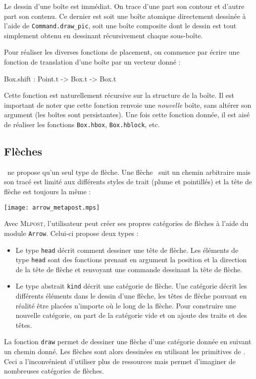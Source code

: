 \documentclass[twoside]{studia-Hermann}
\newcommand{\mlpost}{\textsc{Mlpost}}
\newcommand{\metapost}{\MP}
\begin{document}
Le dessin d'une boîte est immédiat. On trace d'une part son contour et
d'autre part son contenu. Ce dernier est soit
une boîte atomique directement dessinée à l'aide de
\texttt{Command.draw\_pic}, soit une boîte composite dont le dessin
est tout simplement obtenu en dessinant récursivement chaque sous-boîte.

Pour réaliser les diverses fonctions de placement, on commence par
écrire une fonction de translation d'une boîte par un vecteur donné :
\begin{ocaml}
  Box.shift : Point.t -> Box.t -> Box.t
\end{ocaml}
Cette fonction est naturellement récursive sur la structure de la
boîte. Il est important de noter que cette fonction renvoie une
\emph{nouvelle} boîte, sans altérer son argument (les boîtes sont
persistantes). Une fois cette fonction donnée, il est aisé de réaliser
les fonctions \texttt{Box.hbox}, \texttt{Box.hblock}, etc.

\subsection{Flèches} \label{subsec:arrows} %

\metapost\ ne propose qu'un seul type de flèche.
Une flèche \metapost\ suit  un chemin arbitraire   mais son tracé est
limité aux différents styles de trait (plume et pointillés) et la tête
de flèche est toujours la même : 
\begin{center}
\texttt{[image: arrow\_metapost.mps]}
\end{center}
Avec \mlpost, l'utilisateur peut créer ses propres catégories de
flèches à l'aide du module \texttt{Arrow}. Celui-ci propose deux types :
\begin{itemize}
\item  Le  type \texttt{head}  décrit  comment  dessiner  une tête  de
  flèche.   Les  éléments de  type  \texttt{head}  sont des  fonctions
  prenant en argument la position et la direction de la tête de flèche
  et renvoyant une commande dessinant la tête de flèche.
\item Le  type abstrait \texttt{kind} décrit une  catégorie de flèche.
  Une catégorie décrit les différents éléments dans le dessin d'une
  flèche, les têtes de flèche pouvant en réalité être placées
  n'importe où le long de la flèche.
  Pour construire une nouvelle catégorie, on  part de  la catégorie
  vide et on  ajoute des traits et des têtes.
\end{itemize}
La  fonction  \texttt{draw}  permet   de  dessiner  une  flèche  d'une
catégorie donnée  en suivant un  chemin donné. Les flèches  sont alors
dessinées  en   utilisant  les   primitives  de  \metapost.    Ceci  a
l'inconvénient  d'utiliser   plus  de  ressources   mais   permet
d'imaginer de nombreuses catégories de flèches.
\end{document}
